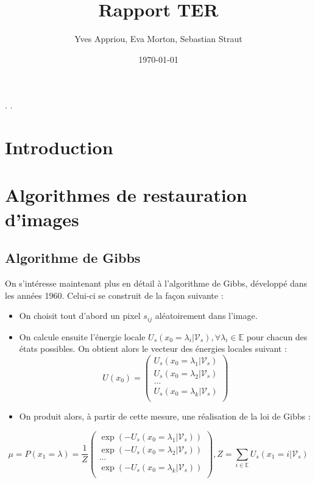 \documentclass[a4paper, 12pt]{article}
\title{Rapport TER}
\author{Yves Appriou, Eva Morton, Sebastian Straut}
\date{\today}
\begin{document}
\maketitle

\tableofcontents.
\newpage.
\section{Introduction}
\section{Algorithmes de restauration d'images}
\subsection[Algorithme de Gibbs]{Algorithme de Gibbs}
On s'intéresse maintenant plus en détail à l'algorithme de Gibbs, développé dans les années 1960. Celui-ci se construit de la façon suivante : 
\begin{itemize}
\item On choisit tout d'abord un pixel $s_{ij} $ aléatoirement dans l'image.
\item On calcule ensuite l'énergie locale $U_s(x_0=\lambda_i| \mathcal{V}_s), \forall \lambda_i \in \mathbb{E}  $ pour chacun des états possibles. On obtient alors le vecteur des énergies locales suivant : 
\[
  U(x_0) = \left(
          \begin{array}{ll}
            U_s(x_0=\lambda_1| \mathcal{V}_s) \\
            U_s(x_0=\lambda_2| \mathcal{V}_s) \\
            ...\\
            U_s(x_0=\lambda_k| \mathcal{V}_s) \\
          \end{array}
        \right)
\]
\item On produit alors, à partir de cette mesure, une réalisation de la loi de Gibbs : 
\end{itemize}
\[
  \mu = P(x_1 = \lambda) = \frac{1}{Z} \left(
          \begin{array}{ll}
            \exp(-U_s(x_0=\lambda_1| \mathcal{V}_s)) \\
            \exp(-U_s(x_0=\lambda_2| \mathcal{V}_s)) \\
            ...\\
            \exp(-U_s(x_0=\lambda_k| \mathcal{V}_s)) \\
          \end{array}
        \right)
        , Z= \sum_{i\in \mathbb{E}} {U_s(x_1=i | \mathcal{V}_s)}
\]
\end{document}
